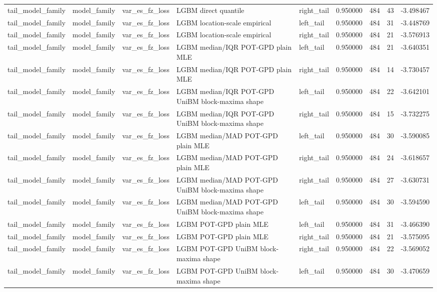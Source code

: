 \begin{tabular}{lllllrrr}
tail\_model\_family & model\_family & var\_es\_fz\_loss & LGBM direct quantile & right\_tail & 0.950000 & 484 & 43 & -3.498467 \\
tail\_model\_family & model\_family & var\_es\_fz\_loss & LGBM location-scale empirical & left\_tail & 0.950000 & 484 & 31 & -3.448769 \\
tail\_model\_family & model\_family & var\_es\_fz\_loss & LGBM location-scale empirical & right\_tail & 0.950000 & 484 & 21 & -3.576913 \\
tail\_model\_family & model\_family & var\_es\_fz\_loss & LGBM median/IQR POT-GPD plain MLE & left\_tail & 0.950000 & 484 & 21 & -3.640351 \\
tail\_model\_family & model\_family & var\_es\_fz\_loss & LGBM median/IQR POT-GPD plain MLE & right\_tail & 0.950000 & 484 & 14 & -3.730457 \\
tail\_model\_family & model\_family & var\_es\_fz\_loss & LGBM median/IQR POT-GPD UniBM block-maxima shape & left\_tail & 0.950000 & 484 & 22 & -3.642101 \\
tail\_model\_family & model\_family & var\_es\_fz\_loss & LGBM median/IQR POT-GPD UniBM block-maxima shape & right\_tail & 0.950000 & 484 & 15 & -3.732275 \\
tail\_model\_family & model\_family & var\_es\_fz\_loss & LGBM median/MAD POT-GPD plain MLE & left\_tail & 0.950000 & 484 & 30 & -3.590085 \\
tail\_model\_family & model\_family & var\_es\_fz\_loss & LGBM median/MAD POT-GPD plain MLE & right\_tail & 0.950000 & 484 & 24 & -3.618657 \\
tail\_model\_family & model\_family & var\_es\_fz\_loss & LGBM median/MAD POT-GPD UniBM block-maxima shape & right\_tail & 0.950000 & 484 & 27 & -3.630731 \\
tail\_model\_family & model\_family & var\_es\_fz\_loss & LGBM median/MAD POT-GPD UniBM block-maxima shape & left\_tail & 0.950000 & 484 & 30 & -3.594590 \\
tail\_model\_family & model\_family & var\_es\_fz\_loss & LGBM POT-GPD plain MLE & left\_tail & 0.950000 & 484 & 31 & -3.466390 \\
tail\_model\_family & model\_family & var\_es\_fz\_loss & LGBM POT-GPD plain MLE & right\_tail & 0.950000 & 484 & 21 & -3.575095 \\
tail\_model\_family & model\_family & var\_es\_fz\_loss & LGBM POT-GPD UniBM block-maxima shape & right\_tail & 0.950000 & 484 & 22 & -3.569052 \\
tail\_model\_family & model\_family & var\_es\_fz\_loss & LGBM POT-GPD UniBM block-maxima shape & left\_tail & 0.950000 & 484 & 30 & -3.470659 \\

\end{tabular}
